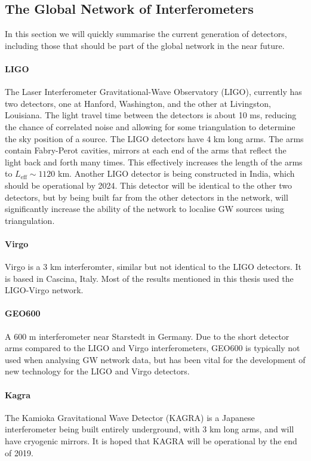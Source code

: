 \documentclass[11pt]{cuthesis}
\begin{document}
\subsection{The Global Network of Interferometers} \label{sec:gw network}
In this section we will quickly summarise the current generation of detectors, including those that should be part of the global network in the near future.
\paragraph{LIGO}
The Laser Interferometer Gravitational-Wave Observatory (LIGO), currently has two detectors, one at Hanford, Washington, and the other at Livingston, Louisiana. The light travel time between the detectors is about 10 ms, reducing the chance of correlated noise and allowing for some triangulation to determine the sky position of a source. The LIGO detectors have 4 km long arms. The arms contain Fabry-Perot cavities, mirrors at each end of the arms that reflect the light back and forth many times. This effectively increases the length of the arms to $L_\text{eff}\sim1120$ km. Another LIGO detector is being constructed in India, which should be operational by 2024. This detector will be identical to the other two detectors, but by being built far from the other detectors in the network, will significantly increase the ability of the network to localise GW sources using triangulation.

\paragraph{Virgo}
Virgo is a 3 km interferomter, similar but not identical to the LIGO detectors. It is based in Cascina, Italy. Most of the results mentioned in this thesis used the LIGO-Virgo network. 

\paragraph{GEO600}
A 600 m interferometer near Starstedt in Germany. Due to the short detector arms compared to the LIGO and Virgo interferometers, GEO600 is typically not used when analysing GW network data, but has been vital for the development of new technology for the LIGO and Virgo detectors. 

\paragraph{Kagra}
The Kamioka Gravitational Wave Detector (KAGRA) is a Japanese interferometer being built entirely underground, with 3 km long arms, and will have cryogenic mirrors. It is hoped that KAGRA will be operational by the end of 2019.
\end{document}
